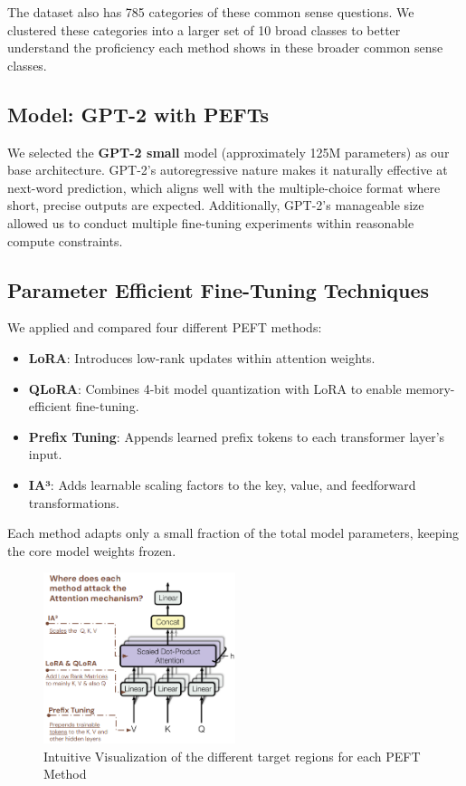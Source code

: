 \documentclass[11pt,twocolumn]{article}
\begin{document}
The dataset also has 785 categories of these common sense questions. We clustered these categories into a larger set of 10 broad classes to better understand the proficiency each method shows in these broader common sense classes.

\subsection{Model: GPT-2 with PEFTs}
We selected the \textbf{GPT-2 small} model (approximately 125M parameters) as our base architecture. GPT-2's autoregressive nature makes it naturally effective at next-word prediction, which aligns well with the multiple-choice format where short, precise outputs are expected. Additionally, GPT-2's manageable size allowed us to conduct multiple fine-tuning experiments within reasonable compute constraints.

\subsection{Parameter Efficient Fine-Tuning Techniques}
We applied and compared four different PEFT methods:
\begin{itemize}
    \item \textbf{LoRA}: Introduces low-rank updates within attention weights.
    \item \textbf{QLoRA}: Combines 4-bit model quantization with LoRA to enable memory-efficient fine-tuning.
    \item \textbf{Prefix Tuning}: Appends learned prefix tokens to each transformer layer’s input.
    \item \textbf{IA³}: Adds learnable scaling factors to the key, value, and feedforward transformations.
\end{itemize}
Each method adapts only a small fraction of the total model parameters, keeping the core model weights frozen.

\begin{figure}[h]
\centering
\includegraphics[width=0.5\textwidth]{../graphs/PEFTs.png}
\caption{Intuitive Visualization of the different target regions for each PEFT Method}
\label{fig:peft-target}
\end{figure}
\end{document}
